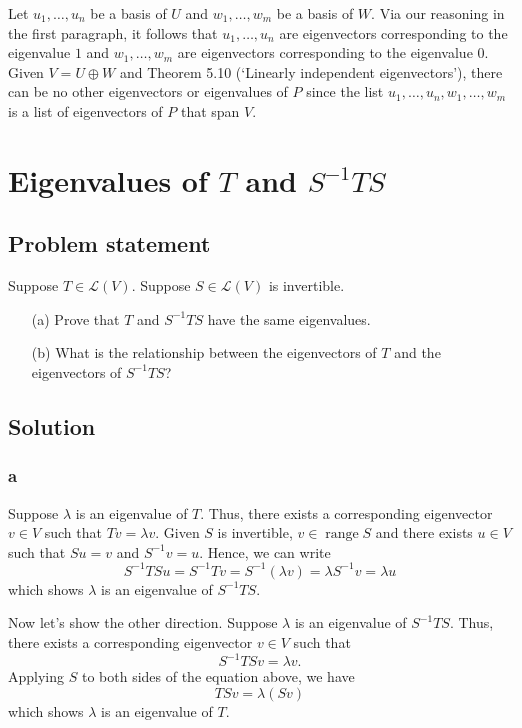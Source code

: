\documentclass{article}
\begin{document}
Let $u_1,\ldots,u_n$ be a basis of $U$ and $w_1,\ldots,w_m$ be a basis of $W$. 
Via our reasoning in the first paragraph, it follows that $u_1,\ldots,u_n$ are eigenvectors corresponding to the eigenvalue $1$ and $w_1,\ldots,w_m$ are eigenvectors corresponding to the eigenvalue $0$. 
Given $V=U\oplus W$ and Theorem 5.10 (`Linearly independent eigenvectors'), there can be no other eigenvectors or eigenvalues of $P$ since the list $u_1,\ldots,u_n,w_1,\ldots,w_m$ is a list of eigenvectors of $P$ that span $V$.

\clearpage

\section{Eigenvalues of $T$ and $S^{-1}TS$}
\subsection*{Problem statement}
Suppose $T\in\mathcal{L}(V)$. 
Suppose $S\in\mathcal{L}(V)$ is invertible.
\begin{enumerate}
    \item[(a)] Prove that $T$ and $S^{-1}TS$ have the same eigenvalues.
    \item[(b)] What is the relationship between the eigenvectors of $T$ and the eigenvectors of $S^{-1}TS$?
\end{enumerate}

\subsection*{Solution}
\subsubsection*{a}
Suppose $\lambda$ is an eigenvalue of $T$. 
Thus, there exists a corresponding eigenvector $v\in V$ such that $Tv=\lambda v$. 
Given $S$ is invertible, $v\in\operatorname{range}S$ and there exists $u\in V$ such that $Su=v$ and $S^{-1}v=u$. 
Hence, we can write
\[S^{-1}TSu=S^{-1}Tv=S^{-1}(\lambda v)=\lambda S^{-1}v=\lambda u\]
which shows $\lambda$ is an eigenvalue of $S^{-1}TS$.

Now let's show the other direction. 
Suppose $\lambda$ is an eigenvalue of $S^{-1}TS$. 
Thus, there exists a corresponding eigenvector $v\in V$ such that 
\[S^{-1}TSv=\lambda v.\]
Applying $S$ to both sides of the equation above, we have
\[TSv=\lambda(Sv)\]
which shows $\lambda$ is an eigenvalue of $T$.
\end{document}
